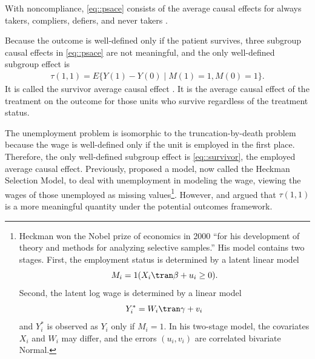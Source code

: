 \setcounter{example}{0}
\begin{example}[noncompliance]
With noncompliance, \eqref{eq::psace} consists of the average causal effects for always takers, compliers, defiers, and never takers \citep{imbens1994identification, angrist1996identification}. 
\end{example}



\begin{example}
Because the outcome is well-defined only if the patient survives, three subgroup causal effects in \eqref{eq::psace}  are not meaningful, and the only well-defined subgroup effect is
\begin{eqnarray}
\label{eq::survivor}
\tau(1,1) = E\{  Y(1) - Y(0) \mid M(1) = 1, M(0) =1\} .
\end{eqnarray}
It is called the survivor average causal effect \citep{rubin2006causal}. It is the average causal effect of the treatment on the outcome for those units who survive regardless of the treatment status. 
\end{example}



\begin{example}[unemployment]
The unemployment problem is isomorphic to the truncation-by-death problem because the wage is well-defined only if the unit is employed in the first place. Therefore, the only well-defined subgroup effect is \eqref{eq::survivor}, the employed average causal effect. Previously, \citet{heckman1979sample} proposed a model, now called the Heckman Selection Model, to deal with unemployment in modeling the wage, viewing the wages of those unemployed as missing values\footnote{Heckman won the Nobel prize of economics in 2000 ``for his development of theory and methods for analyzing selective samples.''
His model contains two stages. First, the employment status is determined by a latent linear model
$$
M_i = 1(X_i\tran \beta + u_i \geq 0).
$$
Second, the latent log wage is determined by a linear model
$$
Y_i^* = W_i\tran \gamma + v_i
$$
and $Y_i^*$ is observed as $Y_i$ only if $M_i = 1$. In his two-stage model, the covariates $X_i$ and $W_i$ may differ, and the errors $(u_i , v_i)$ are correlated bivariate Normal. 
}. However, \citet{zhang2003estimation} and \citet{zhang2009likelihood} argued that $\tau(1,1)$ is a more meaningful quantity under the potential outcomes framework. 
\end{example} 




